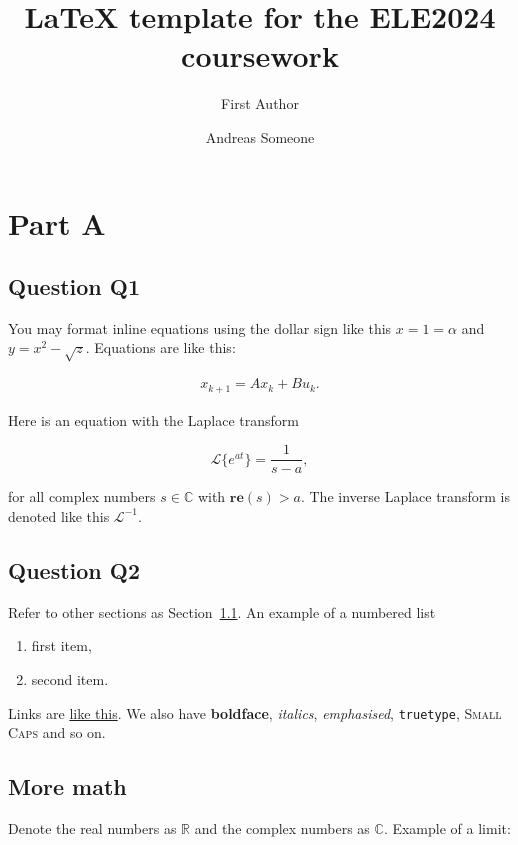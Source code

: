 \documentclass[a4paper,11pt,reqno]{amsart}
\title[ELE2024 Coursework]{LaTeX template for the ELE2024 coursework}
\author[F. Author]{First Author}
\author[A. Someone]{Andreas Someone}
\renewcommand{\Re}{\mathbf{re}}
\newcommand{\R}{\mathbb{R}}
\newcommand{\C}{\mathbb{C}}
\newcommand{\lap}{\mathscr{L}}
\begin{document}
\maketitle


\section{Part A}
    
    \subsection{Question Q1}\label{sec:q1}
        You may format inline equations using the dollar sign like this $x = 1 = \alpha$ and $y = x^2 - \sqrt{z}$. Equations are like this:
        
        \begin{align}\label{eq:lti_state_update}
            x_{k+1} = A x_k + Bu_k.
        \end{align}
        
        Here is an equation with the Laplace transform
        
        \begin{equation}
            \lap \{e^{at}\} = \frac{1}{s-a},
        \end{equation}
        
        for all complex numbers $s\in\C$ with $\Re(s)>a$. The inverse Laplace transform is denoted like this $\lap^{-1}$.
    
    \subsection{Question Q2}
        Refer to other sections as Section~\ref{sec:q1}. An example of a numbered list
        \begin{enumerate}
            \item first item,
            \item second item.
        \end{enumerate}
        Links are \href{https://google.com}{like this}. We also have \textbf{boldface}, \textit{italics},
        \emph{emphasised}, \texttt{truetype}, \textsc{Small Caps} and so on.
    
    \subsection{More math} Denote the real numbers as $\R$ and the complex numbers as $\C$. Example of a limit:
    
\end{document}

